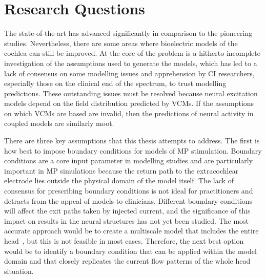 
\section{Research Questions}
\label{sect:research_questions}

The state-of-the-art has advanced significantly in comparison to the
pioneering studies. Nevertheless, there are some areas where \insilico{}
bioelectric models of the cochlea can still be improved. At the core of the
problem is a hitherto incomplete investigation of the assumptions used to
generate the models, which has led to a lack of consensus on some modelling
issues and apprehension by CI researchers, especially those on the clinical end
of the spectrum, to trust modelling predictions. These outstanding issues must
be resolved because neural excitation models depend on the field distribution
predicted by VCMs. If the assumptions on which VCMs are based are invalid, then
the predictions of neural activity in coupled models are similarly moot.



There are three key assumptions that this thesis attempts to address. The first
is how best to impose boundary conditions for models of MP stimulation. Boundary
conditions are a core input parameter in modelling studies and are particularly
important in MP simulations because the return path to the extracochlear
electrode lies outside the physical domain of the model itself. The lack of
consensus for prescribing boundary conditions is not ideal for practitioners and
detracts from the appeal of models to clinicians. Different boundary conditions
will affect the exit paths taken by injected current, and the significance of
this impact on results in the neural structures has not yet been studied. The
most accurate approach would be to create a multiscale model that includes the
entire head~\cite{tran2015}, but this is not feasible in most cases. Therefore,
the next best option would be to identify a boundary condition that can be
applied within the model domain and that closely replicates the current flow
patterns of the whole head situation.

